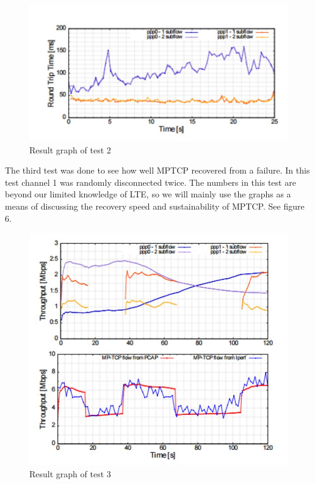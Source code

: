 \documentclass[11pt,twocolumn]{article}
\begin{document}
\begin{figure}[ht]
\begin{center}
\includegraphics[scale=0.5]{graph_3}
\caption{Result graph of test 2}
\end{center}
\end{figure}

The third test was done to see how well MPTCP recovered from a failure. In this test channel 1 was randomly disconnected twice. The numbers in this test are beyond our limited knowledge of LTE, so we will mainly use the graphs as a means of discussing the recovery speed and sustainability of MPTCP. See figure 6.

\begin{figure}[ht]
\begin{center}
\includegraphics[scale=0.6]{graph_4}
\caption{Result graph of test 3}
\end{center}
\end{figure}
\end{document}
